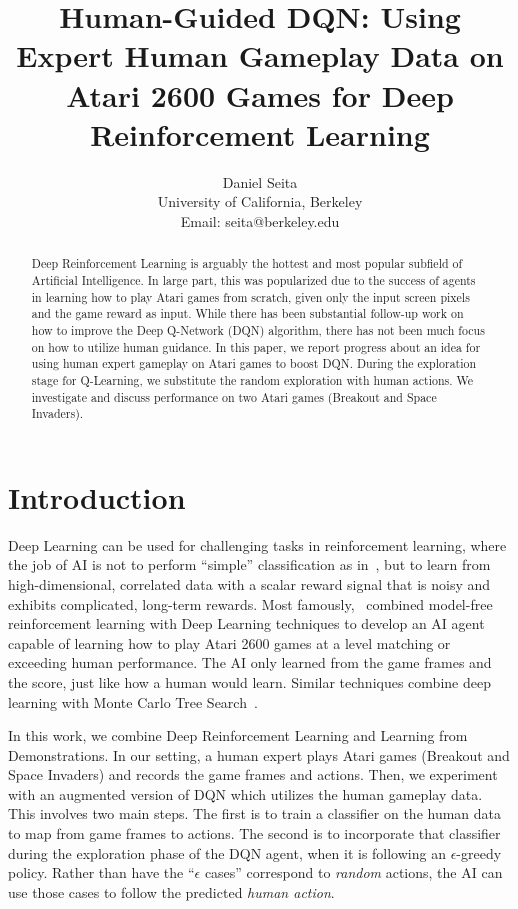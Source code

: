 \documentclass[letterpaper, 10pt, conference]{ieeeconf}
\title{\LARGE \bf Human-Guided DQN: Using Expert Human Gameplay Data on Atari
2600 Games for Deep Reinforcement Learning}
\author{Daniel Seita \\
University of California, Berkeley\\
Email: seita@berkeley.edu
}
\begin{document}
\maketitle

\begin{abstract}
Deep Reinforcement Learning is arguably the hottest and most popular subfield of
Artificial Intelligence. In large part, this was popularized due to the success
of agents in learning how to play Atari games from scratch, given only the input
screen pixels and the game reward as input.  While there has been substantial
follow-up work on how to improve the Deep Q-Network (DQN) algorithm, there has
not been much focus on how to utilize human guidance. In this paper, we report
progress about an idea for using human expert gameplay on Atari games to boost
DQN. During the exploration stage for Q-Learning, we substitute the random
exploration with human actions. We investigate and discuss performance on two
Atari games (Breakout and Space Invaders).
\end{abstract}

\section{Introduction}\label{sec:introduction}

Deep Learning can be used for challenging tasks in reinforcement learning, where
the job of AI is not to perform ``simple'' classification as
in~\cite{AlexNet2012}, but to learn from high-dimensional, correlated data with
a scalar reward signal that is noisy and exhibits complicated, long-term
rewards. Most famously,~\cite{mnih-dqn-2015} combined model-free reinforcement
learning with Deep Learning techniques to develop an AI agent capable of
learning how to play Atari 2600 games at a level matching or exceeding human
performance. The AI only learned from the game frames and the score, just like
how a human would learn. Similar techniques combine deep learning with Monte
Carlo Tree Search~\cite{nips-atari-2014,silver-alphago-2016}.

In this work, we combine Deep Reinforcement Learning and Learning from
Demonstrations. In our setting, a human expert plays Atari games (Breakout and
Space Invaders) and records the game frames and actions.  Then, we experiment
with an augmented version of DQN which utilizes the human gameplay data. This
involves two main steps. The first is to train a classifier on the human data to
map from game frames to actions. The second is to incorporate that classifier
during the exploration phase of the DQN agent, when it is following an
$\epsilon$-greedy policy. Rather than have the ``$\epsilon$ cases'' correspond
to \emph{random} actions, the AI can use those cases to follow the predicted
\emph{human action}.
\end{document}
